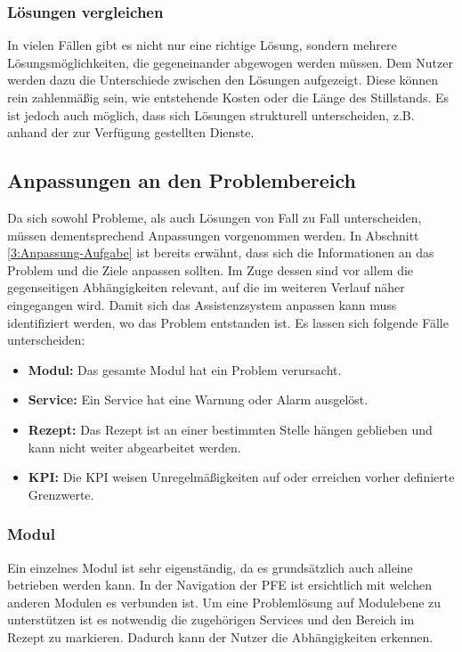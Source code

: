 \subsubsection*{Lösungen vergleichen}
In vielen Fällen gibt es nicht nur eine richtige Lösung, sondern mehrere Lösungsmöglichkeiten, die gegeneinander abgewogen werden müssen. Dem Nutzer werden dazu die Unterschiede zwischen den Lösungen aufgezeigt. Diese können rein zahlenmäßig sein, wie entstehende Kosten oder die Länge des Stillstands. Es ist jedoch auch möglich, dass sich Lösungen strukturell unterscheiden, z.B. anhand der zur Verfügung gestellten Dienste.

\subsection{Anpassungen an den Problembereich}
Da sich sowohl Probleme, als auch Lösungen von Fall zu Fall unterscheiden, müssen dementsprechend Anpassungen vorgenommen werden. In Abschnitt \ref{3:Anpassung-Aufgabe} ist bereits erwähnt, dass sich die Informationen an das Problem und die Ziele anpassen sollten. Im Zuge dessen sind vor allem die gegenseitigen Abhängigkeiten relevant, auf die im weiteren Verlauf näher eingegangen wird. Damit sich das Assistenzsystem anpassen kann muss identifiziert werden, wo das Problem entstanden ist. Es lassen sich folgende Fälle unterscheiden:
\begin{itemize}
\item \textbf{Modul:} Das gesamte Modul hat ein Problem verursacht.
\item \textbf{Service:} Ein Service hat eine Warnung oder Alarm ausgelöst.
\item \textbf{Rezept:} Das Rezept ist an einer bestimmten Stelle hängen geblieben und kann nicht weiter abgearbeitet werden.
\item \textbf{KPI:} Die KPI weisen Unregelmäßigkeiten auf oder erreichen vorher definierte Grenzwerte.
\end{itemize}

\subsubsection*{Modul}
Ein einzelnes Modul ist sehr eigenständig, da es grundsätzlich auch alleine betrieben werden kann. In der Navigation der PFE ist ersichtlich mit welchen anderen Modulen es verbunden ist. Um eine Problemlösung auf Modulebene zu unterstützen ist es notwendig die zugehörigen Services und den Bereich im Rezept zu markieren. Dadurch kann der Nutzer die Abhängigkeiten erkennen. 

